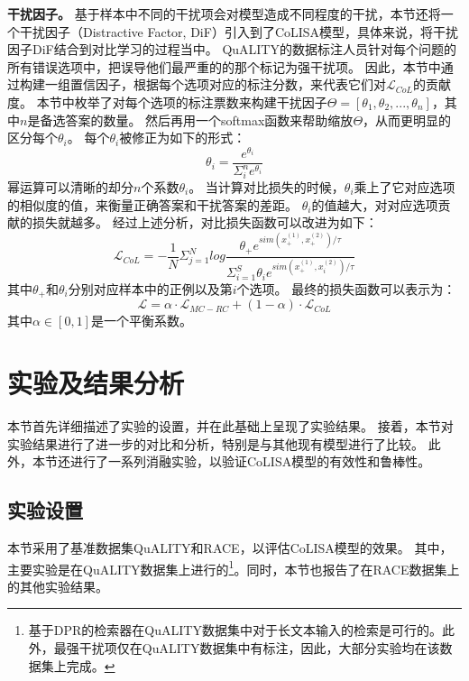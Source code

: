 \textbf{干扰因子。}
基于样本中不同的干扰项会对模型造成不同程度的干扰，本节还将一个干扰因子（Distractive Factor, DiF）引入到了CoLISA模型，具体来说，将干扰因子DiF结合到对比学习的过程当中。
QuALITY的数据标注人员针对每个问题的所有错误选项中，把误导他们最严重的的那个标记为强干扰项。
因此，本节中通过构建一组置信因子，根据每个选项对应的标注分数，来代表它们对$\mathcal L_{CoL}$的贡献度。
本节中枚举了对每个选项的标注票数来构建干扰因子$\Theta=[\theta_1, \theta_2, ..., \theta_n]$，其中$n$是备选答案的数量。
然后再用一个softmax函数来帮助缩放$\Theta$，从而更明显的区分每个$\theta_i$。
每个$\theta_i$被修正为如下的形式：
\begin{equation}
    \theta_i=\frac{e^{\theta_i}}{\Sigma^n_i e^{\theta_i}}
\end{equation}
幂运算可以清晰的却分$n$个系数$\theta_i$。
当计算对比损失的时候，$\theta_i$乘上了它对应选项的相似度的值，来衡量正确答案和干扰答案的差距。
$\theta_i$的值越大，对对应选项贡献的损失就越多。
经过上述分析，对比损失函数可以改进为如下：
\begin{equation}
    \mathcal L_{CoL}=-\frac{1}{N}\Sigma^N_{j=1}log \frac{\theta_+e^{sim(x^{(1)}_+,x^{(2)}_+)/ \tau}}{\Sigma^S_{i=1} \theta_ie^{sim(x^{(1)}_+,x^{(2)}_i)/ \tau}}
\end{equation}
其中$\theta_+$和$\theta_i$分别对应样本中的正例以及第$i$个选项。
最终的损失函数可以表示为：
\begin{equation}
    \mathcal L=\alpha \cdot \mathcal L_{MC-RC}+(1-\alpha) \cdot \mathcal L_{CoL}
\end{equation}
其中$\alpha \in[0,1]$是一个平衡系数。


\section{实验及结果分析}
本节首先详细描述了实验的设置，并在此基础上呈现了实验结果。
接着，本节对实验结果进行了进一步的对比和分析，特别是与其他现有模型进行了比较。
此外，本节还进行了一系列消融实验，以验证CoLISA模型的有效性和鲁棒性。

\subsection{实验设置}
本节采用了基准数据集QuALITY和RACE，以评估CoLISA模型的效果。
其中，主要实验是在QuALITY数据集上进行的\footnote{基于DPR的检索器在QuALITY数据集中对于长文本输入的检索是可行的。此外，最强干扰项仅在QuALITY数据集中有标注，因此，大部分实验均在该数据集上完成。}。同时，本节也报告了在RACE数据集上的其他实验结果。

